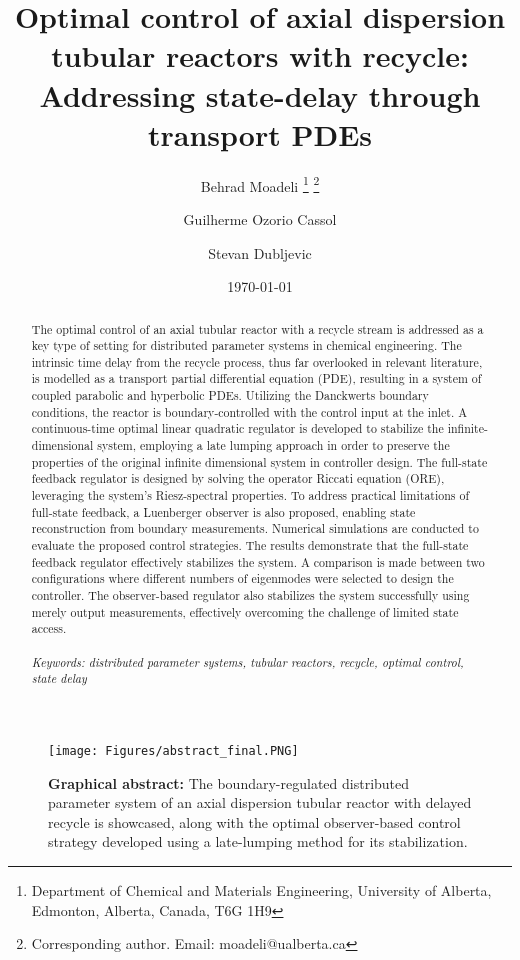 \documentclass[letterpaper,12pt]{article}
\title{Optimal control of axial dispersion tubular reactors with recycle: Addressing state-delay through transport PDEs}
\author{
  Behrad Moadeli \thanks{Department of Chemical and Materials Engineering, University of Alberta, Edmonton, Alberta, Canada, T6G 1H9} \thanks{Corresponding author. Email: moadeli@ualberta.ca} \and
  Guilherme Ozorio Cassol\footnotemark[1] \and
  Stevan Dubljevic \footnotemark[1] 
  }
\date{\today}
\begin{document}
\maketitle

\begin{figure}[htbp!]
  \centering
  \texttt{[image: Figures/abstract\_final.PNG]}
  \caption*{\textbf{Graphical abstract:}
  The boundary-regulated distributed parameter system of an axial dispersion tubular reactor with delayed recycle is showcased, along with the optimal observer-based control strategy developed using a late-lumping method for its stabilization.}
\end{figure}

\newpage
\begin{abstract}
  The optimal control of an axial tubular reactor with a recycle stream is addressed as a key type of setting for distributed parameter systems in chemical engineering. The intrinsic time delay from the recycle process, thus far overlooked in relevant literature, is modelled as a transport partial differential equation (PDE), resulting in a system of coupled parabolic and hyperbolic PDEs. Utilizing the Danckwerts boundary conditions, the reactor is boundary-controlled with the control input at the inlet. A continuous-time optimal linear quadratic regulator is developed to stabilize the infinite-dimensional system, employing a late lumping approach in order to preserve the properties of the original infinite dimensional system in controller design. The full-state feedback regulator is designed by solving the operator Riccati equation (ORE), leveraging the system's Riesz-spectral properties. To address practical limitations of full-state feedback, a Luenberger observer is also proposed, enabling state reconstruction from boundary measurements.
  Numerical simulations are conducted to evaluate the proposed control strategies. The results demonstrate that the full-state feedback regulator effectively stabilizes the system. A comparison is made between two configurations where different numbers of eigenmodes were selected to design the controller. The observer-based regulator also stabilizes the system successfully using merely output measurements, effectively overcoming the challenge of limited state access. \\ \, \\
  \textit{Keywords: distributed parameter systems, tubular reactors, recycle, optimal control, state delay}
\end{abstract}

\newpage
      
\onehalfspacing

  
  
  
  
  
    
  

  
  
   
  \newpage
  \printbibliography


% 
\end{document}
